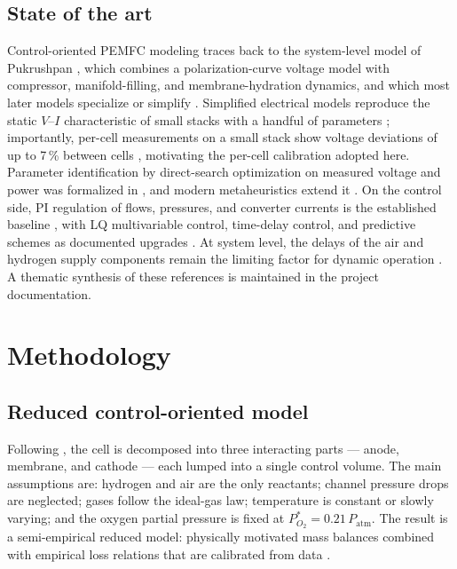 \documentclass[11pt,a4paper]{article}
\begin{document}
\subsection{State of the art}

Control-oriented PEMFC modeling traces back to the system-level model of
Pukrushpan \cite{pukrushpan2003}, which combines a polarization-curve voltage model
with compressor, manifold-filling, and membrane-hydration dynamics, and which most
later models specialize or simplify \cite{thanapalan2008,kim2010,zhu2017}.
Simplified electrical models reproduce the static $V$--$I$ characteristic of small
stacks with a handful of parameters \cite{manana2006,shen2005}; importantly,
per-cell measurements on a small stack show voltage deviations of up to 7\,\%
between cells \cite{manana2006}, motivating the per-cell calibration adopted here.
Parameter identification by direct-search optimization on measured voltage and
power was formalized in \cite{thanapalan2008}, and modern metaheuristics extend it
\cite{cao2019}. On the control side, PI regulation of flows, pressures, and
converter currents is the established baseline \cite{zhu2017,derbeli2017},
with LQ multivariable control, time-delay control, and predictive schemes as
documented upgrades \cite{pukrushpan2003,kim2010,wang2021simulation}. At system
level, the delays of the air and hydrogen supply components remain the limiting
factor for dynamic operation \cite{kharrat2025}. A thematic synthesis of these
references is maintained in the project documentation.

\section{Methodology}
\label{sec:methodology}

\subsection{Reduced control-oriented model}
\label{sec:model}

Following \cite{thanapalan2008,pukrushpan2003}, the cell is decomposed into three
interacting parts --- anode, membrane, and cathode --- each lumped into a single
control volume. The main assumptions are: hydrogen and air are the only reactants;
channel pressure drops are neglected; gases follow the ideal-gas law; temperature
is constant or slowly varying; and the oxygen partial pressure is fixed at
$P_{O_2}^{\ast}=0.21\,P_{\mathrm{atm}}$. The result is a semi-empirical reduced
model: physically motivated mass balances combined with empirical loss relations
that are calibrated from data \cite{cao2019}.
\end{document}
